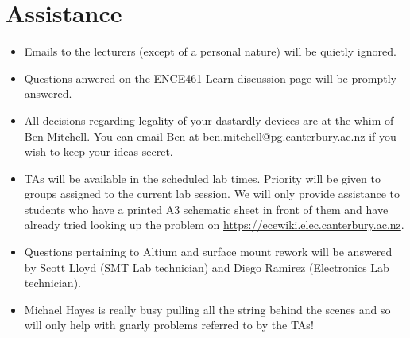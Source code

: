 \documentclass[11pt, a4paper]{article}
\begin{document}
\section{Assistance}


\begin{itemize}
\item Emails to the lecturers (except of a personal nature) will be
  quietly ignored.

\item Questions anwered on the ENCE461 Learn discussion page will be
  promptly answered.

\item All decisions regarding legality of your dastardly devices are
  at the whim of Ben Mitchell.  You can email Ben at
  \href{mailto://ben.mitchell@pg.canterbury.ac.nz}{ben.mitchell@pg.canterbury.ac.nz} if you wish to keep your ideas secret.

\item TAs will be available in the scheduled lab times.  Priority will
  be given to groups assigned to the current lab session.  We will
  only provide assistance to students who have a printed A3 schematic
  sheet in front of them and have already tried looking up the problem
  on \url{https://ecewiki.elec.canterbury.ac.nz}.

\item Questions pertaining to Altium and surface mount rework will be
  answered by Scott Lloyd (SMT Lab technician) and Diego Ramirez
  (Electronics Lab technician).

\item Michael Hayes is really busy pulling all the string behind the
  scenes and so will only help with gnarly problems referred to by the
  TAs!
  
\end{itemize}
\end{document}
